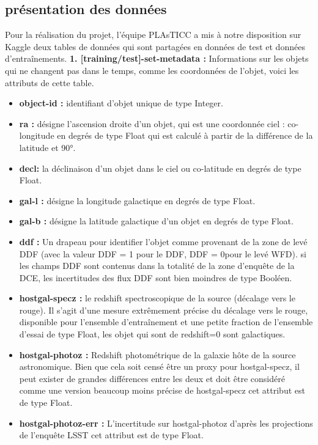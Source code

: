 \subsection{présentation des données}
Pour la réalisation du projet, l’équipe PLAsTICC a mis à notre disposition sur Kaggle deux tables de données qui sont partagées en données de test et données d’entraînements.
\newline
\newline
\textbf{1. [training/test]-set-metadata :} Informations sur les objets qui ne changent pas dans le temps, comme les coordonnées de l’objet, voici les attributs de cette table.
\begin{itemize}
    \item \textbf{object-id :} identifiant d’objet unique de type Integer.
    \item \textbf{ra :} désigne l’ascension droite d’un objet, qui est une coordonnée ciel : co-longitude en degrés de type Float qui est calculé à partir de la différence de la latitude et 90°.
    \item \textbf{ decl:} la déclinaison d’un objet dans le ciel ou co-latitude en degrés de type Float.
    \item \textbf{ gal-l :} désigne la longitude galactique en degrés de type Float.
    \item \textbf{gal-b : }désigne la latitude galactique d’un objet en degrés de type Float.
    \item \textbf{ ddf :} Un drapeau pour identifier l’objet comme provenant de la zone de levé DDF (avec la valeur DDF = 1 pour le DDF, DDF = 0pour le levé WFD). si les champs DDF sont contenus dans la totalité de la zone d’enquête de la DCE, les incertitudes des flux DDF sont bien moindres de type Booléen.
    \item \textbf{ hostgal-specz : }le redshift spectroscopique de la source (décalage vers le rouge). Il s’agit d’une mesure extrêmement précise du décalage vers le rouge, disponible pour l’ensemble d’entraînement et une petite fraction de l’ensemble d’essai de type Float, les objet qui sont de redshift=0 sont galactiques.
    \item \textbf{hostgal-photoz :} Redshift photométrique de la galaxie hôte de la source astronomique. Bien que cela soit censé être un proxy pour hostgal-specz, il peut exister de grandes différences entre les deux et doit être considéré comme une version beaucoup moins précise de hostgal-specz cet attribut est de type Float.
    \item \textbf{hostgal-photoz-err :} L’incertitude sur hostgal-photoz d’après les projections de l’enquête LSST cet attribut est de type Float.

\end{itemize}
